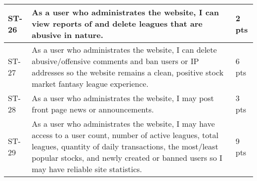 \begin{longtable}{|p{0.6in}|p{4.6in}|p{0.5in}|}
ST-26&As a user who administrates the website, I can view reports of and delete leagues that are abusive in nature.&2 pts  \\ \hline 
ST-27&As a user who administrates the website, I can delete abusive/offensive comments and ban users or IP addresses so the website remains a clean, positive stock market fantasy league experience.&6 pts  \\ \hline 
ST-28&As a user who administrates the website, I may post front page news or announcements.&3 pts  \\ \hline 
ST-29&As a user who administrates the website, I may have access to a user count, number of active leagues, total leagues, quantity of daily transactions, the most/least popular stocks, and newly created or banned users so I may have reliable site statistics. &9 pts \\ \hline 
\end{longtable}